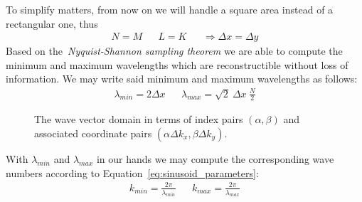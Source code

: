 To simplify matters, from now on we will handle a square area instead of a
rectangular one, thus
\begin{align}
\label{eq:square_area}
 N = M && L = K &&\Rightarrow \Delta x = \Delta y
\end{align}
%
Based on the~\emph{Nyquist-Shannon sampling
theorem}\cite{book:bracewell2000fourier} we are able to compute the minimum and
maximum wavelengths which are reconstructible without loss of information.
We may write said minimum and maximum wavelengths as follows:
\begin{align}
 \lambda_{min} = 2\Delta x && \lambda_{max} = \sqrt{2}~\Delta x~\frac{N}{2}
\end{align}
%
\begin{figure}
\centering
{}
\caption{The wave vector domain in terms of index pairs $(\alpha,\beta)$ and
associated coordinate pairs $(\alpha\Delta k_x,\beta\Delta k_y)$.}
\label{fig:wave_vector_domain}
\end{figure}
%
With $\lambda_{min}$ and $\lambda_{max}$ in our hands we may compute the
corresponding wave numbers according to Equation~\ref{eq:sinusoid_parameters}:
\begin{align}
 k_{min} = \frac{2\pi}{\lambda_{min}} && k_{max} = \frac{2\pi}{\lambda_{max}}
\end{align}
